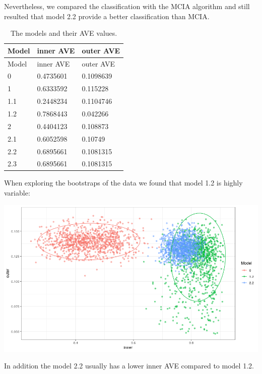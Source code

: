 \documentclass[
  a4paper,
]{book}
\let\origfigure\figure
\let\endorigfigure\endfigure
\renewenvironment{figure}[1][2] {
    \expandafter\origfigure\expandafter[!ht]
} {
    \endorigfigure
}
\begin{document}
Nevertheless, we compared the classification with the MCIA algorithm and still resulted that model 2.2 provide a better classification than MCIA.

\begin{longtable}[]{@{}lll@{}}
\caption{\label{tab:morgan-models-ave} The models and their AVE values.}\tabularnewline
\toprule
Model & inner AVE & outer AVE \\
\midrule
\endfirsthead
\toprule
Model & inner AVE & outer AVE \\
\midrule
\endhead
0 & 0.4735601 & 0.1098639 \\
1 & 0.6333592 & 0.115228 \\
1.1 & 0.2448234 & 0.1104746 \\
1.2 & 0.7868443 & 0.042266 \\
2 & 0.4404123 & 0.108873 \\
2.1 & 0.6052598 & 0.10749 \\
2.2 & 0.6895661 & 0.1081315 \\
2.3 & 0.6895661 & 0.1081315 \\
\bottomrule
\end{longtable}

When exploring the bootstraps of the data we found that model 1.2 is highly variable:

\begin{figure}
\centering
\includegraphics{images/morgan_bootstrap.png}
\caption{\label{fig:morgan-bootstrap} Inner and outer AVE scores of the bootstrapped models 0 1.2 and 2.2. Model 0 does not have sample data. Model 1.2 has microbiome, transcriptonme and sample data in a single block and model 2.2 has microbiome, transcriptome and the sample data split in several blocks.}
\end{figure}

In addition the model 2.2 usually has a lower inner AVE compared to model 1.2.
\end{document}
